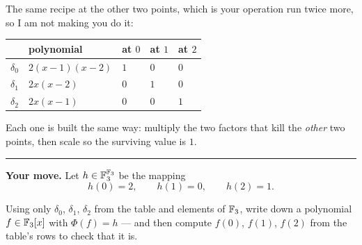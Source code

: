\documentclass[11pt]{article}
\begin{document}
The same recipe at the other two points, which is your operation run twice more,
so I am not making you do it:

\begin{center}\begin{tabular}{lllll}\hline
\textbf{} & \textbf{polynomial} & \textbf{at $0$} & \textbf{at $1$} & \textbf{at $2$} \\ \hline
$\delta_{0}$ & $2(x-1)(x-2)$ & $1$ & $0$ & $0$ \\
$\delta_{1}$ & $2x(x-2)$ & $0$ & $1$ & $0$ \\
$\delta_{2}$ & $2x(x-1)$ & $0$ & $0$ & $1$ \\
\hline\end{tabular}\end{center}

Each one is built the same way: multiply the two factors that kill the \emph{other}
two points, then scale so the surviving value is $1$.

\medskip\hrule\medskip

\textbf{Your move.} Let $h \in \mathbb{F}_{3}^{\mathbb{F}_{3}}$ be the mapping
$$h(0) = 2, \qquad h(1) = 0, \qquad h(2) = 1.$$

Using only $\delta_{0}$, $\delta_{1}$, $\delta_{2}$ from the table and elements
of $\mathbb{F}_{3}$, write down a polynomial $f \in \mathbb{F}_{3}[x]$ with $\Phi(f) = h$ --- and
then compute $f(0)$, $f(1)$, $f(2)$ from the table's rows to check that it is.
\end{document}

